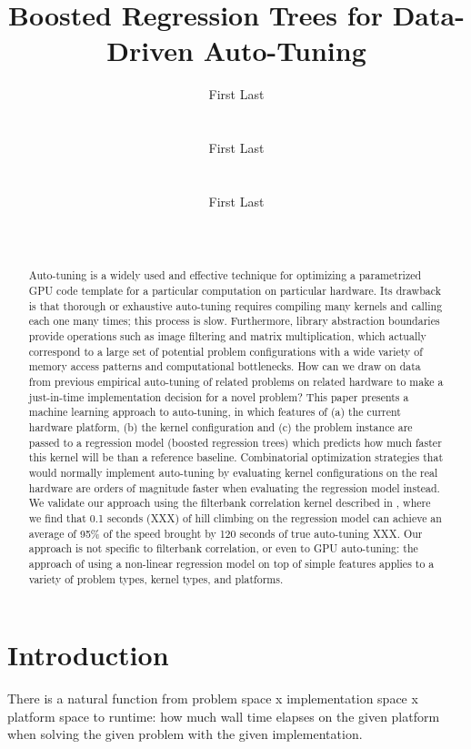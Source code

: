 \documentclass{sig-alternate}
\title{Boosted Regression Trees for Data-Driven Auto-Tuning}
\author{
\alignauthor First Last\\
\affaddr{Affiliation line 1}\\
\affaddr{Affiliation line 2}\\
\email{anon@mail.com}
\alignauthor First Last\\
\affaddr{Affiliation line 1}\\
\affaddr{Affiliation line 2}\\
\email{anon@mail.com}
\alignauthor First Last\\
\affaddr{Affiliation line 1}\\
\affaddr{Affiliation line 2}\\
\email{anon@mail.com}
}
\begin{document}
\maketitle

\begin{abstract}
Auto-tuning is a widely used and effective technique for optimizing a
parametrized GPU code template for a particular computation on particular
hardware.  Its drawback is that thorough or exhaustive auto-tuning requires
compiling many kernels and calling each one many times; this process is slow.
Furthermore, library abstraction boundaries provide operations such as image
filtering and matrix multiplication, which actually correspond to a large set
of potential problem configurations with a wide variety of memory access
patterns and computational bottlenecks.  How can we draw on data from previous
empirical auto-tuning of related problems on related hardware to make a just-in-time
implementation decision for a novel problem?  This paper presents a machine
learning approach to auto-tuning, in which features of (a) the current
hardware platform, (b) the kernel configuration and (c) the problem instance
are passed to a regression model (boosted regression trees) which predicts how
much faster this kernel will be than a reference baseline.  Combinatorial
optimization strategies that would normally implement auto-tuning by
evaluating kernel configurations on the real hardware are orders of magnitude
faster when evaluating the regression model instead.  We validate our approach
using the filterbank correlation kernel described in \citet{pinto+cox:2011gcg}, where we find
that 0.1 seconds (XXX) of hill climbing on the regression model can achieve an
average of 95\% of the speed brought by 120 seconds of true auto-tuning XXX.  Our
approach is not specific to filterbank correlation, or even to GPU
auto-tuning: the approach of using a non-linear regression model on top of
simple features applies to a variety of problem types, kernel types, and
platforms.
\end{abstract}

\section{Introduction}

There is a natural function from
problem space x implementation space x platform space to runtime:
how much wall time elapses on the given platform when solving the given
problem with the given implementation.
\end{document}
